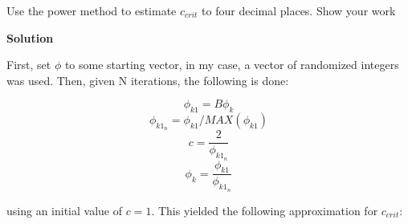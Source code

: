 \documentclass{amsart}
\theoremstyle{definition}
\begin{document}
Use the power method to estimate $c_{crit}$ to four decimal places. Show your work
 
\textbf{Solution}

First, set $\phi$ to some starting vector, in my case, a vector of randomized integers was used.
Then, given N iterations, the following is done:

$$ \phi_{k1} = B \phi_k $$
$$ \phi_{k1_n} = \phi_{k1} / MAX(\phi_{k1}) $$
$$ c = \frac{2}{\phi_{k1_n}} $$
$$ \phi_k = \frac{\phi_{k1}}{\phi_{k1_n}} $$

using an initial value of $c=1$.
This yielded the following approximation for $c_{crit}$:


 
 
 
\end{document}
